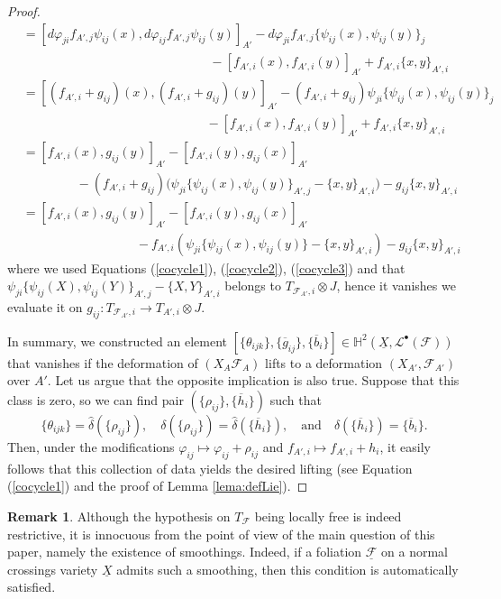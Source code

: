 \documentclass[reqno]{amsart}
\renewcommand\H{\mathbb{H}}
\newcommand{\F}{\mathscr{F}}
\renewcommand{\H}{\mathbb{H}}
\theoremstyle{definition}
\newtheorem{remark}[theorem]{Remark}
\theoremstyle{named}
\begin{document}
\begin{proof}
{\begin{align*}
    & = [d\varphi_{ji}f_{A',j}\psi_{ij}(x),d\varphi_{ij}f_{A',j}\psi_{ij}(y)]_{A'}- d\varphi_{ji}f_{A',j}\{\psi_{ij}(x),\psi_{ij}(y)\}_j\\
    &\qquad\qquad\qquad\qquad\qquad\qquad\qquad\;\;\; - [f_{A',i}(x),f_{A',i}(y)]_{A'}+f_{A',i}\{x,y\}_{A',i}\\
    & = [(f_{A',i}+g_{ij})(x),(f_{A',i}+g_{ij})(y)]_{A'} - (f_{A',i}+g_{ij})\psi_{ji}\{\psi_{ij}(x),\psi_{ij}(y)\}_j\\
    &\qquad\qquad\qquad\qquad\qquad\qquad\qquad\;\;- [f_{A',i}(x),f_{A',i}(y)]_{A'}+f_{A',i}\{x,y\}_{A',i}\\
    & = [f_{A',i}(x),g_{ij}(y)]_{A'}-[f_{A',i}(y),g_{ij}(x)]_{A'} \\
    &\qquad\qquad\;-(f_{A',i}+g_{ij})\big(\psi_{ji}\{\psi_{ij}(x),\psi_{ij}(y)\}_{A',j}-\{x,y\}_{A',i}\big) - g_{ij}\{x,y\}_{A',i}\\
    & = [f_{A',i}(x),g_{ij}(y)]_{A'}-[f_{A',i}(y),g_{ij}(x)]_{A'}\\
    &\qquad\qquad\qquad\qquad\quad- f_{A',i}(\psi_{ji}\{\psi_{ij}(x),\psi_{ij}(y)\}-\{x,y\}_{A',i})- g_{ij}\{x,y\}_{A',i}
\end{align*}}
\noindent where we used Equations (\ref{cocycle1}), (\ref{cocycle2}),  (\ref{cocycle3}) and that $\psi_{ji}\{\psi_{ij}(X),\psi_{ij}(Y)\}_{A',j}-\{X,Y\}_{A',i}$ belongs to $T_{\F_{A'},i}\otimes J$, hence it vanishes we evaluate it on $g_{ij}: T_{\F_{A'},i}\rightarrow T_{A',i}\otimes J$.

In summary,  we constructed an element $[\{\theta_{ijk}\},\{\overline{g}_{ij}\}, \{\overline{b}_i\}]\in \H^2(\underline{X},\mathcal{L}^\bullet(\F))$ that vanishes if the deformation of $(X_A\F_A)$ lifts to a deformation $(X_{A'},\F_{A'})$ over $A'$. Let us argue that the opposite implication is also true. Suppose that this class is zero, so we can find pair $(\{\rho_{ij}\},\{\overline{h}_i\})$ such that
\[
\{\theta_{ijk}\} = \hat\delta(\{\rho_{ij}\}),\quad \delta(\{\rho_{ij}\}) = \hat\delta(\{\overline{h}_{i}\}),\quad\text{and}\quad \delta(\{\overline{h}_i\}) = \{\overline{b}_i\}.
\]
Then, under the modifications $\varphi_{ij}\mapsto \varphi_{ij} + \rho_{ij}$ and $f_{A',i}\mapsto f_{A',i} + h_i$, it easily follows that this collection of data yields the desired lifting (see Equation (\ref{cocycle1}) and the proof of Lemma \ref{lema:defLie}).
\end{proof}

\begin{remark}
  Although the hypothesis on $T_\F$ being locally free is indeed restrictive, it is innocuous from the point of view of the main question of this paper, namely the existence of smoothings. Indeed, if a foliation $\underline{\F}$ on a normal crossings variety $\underline{X}$ admits such a smoothing, then this condition is automatically satisfied. 
\end{remark}
\end{document}
